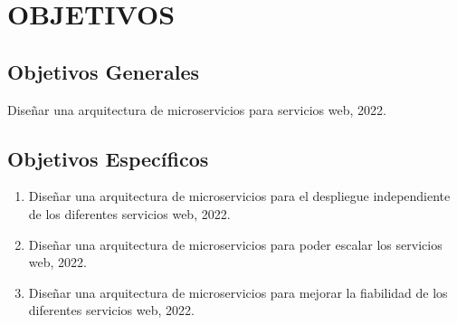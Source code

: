 \section{OBJETIVOS}

%
%
%
%


\subsection{Objetivos Generales}

Diseñar una arquitectura de microservicios para servicios web, 2022.

\subsection{Objetivos Específicos}

\begin{enumerate}
  \item Diseñar una arquitectura de microservicios para el despliegue independiente de los diferentes servicios web, 2022.
  \item Diseñar una arquitectura de microservicios para poder escalar los servicios web, 2022.
  \item Diseñar una arquitectura de microservicios para mejorar la fiabilidad de los diferentes servicios web, 2022.
\end{enumerate}
